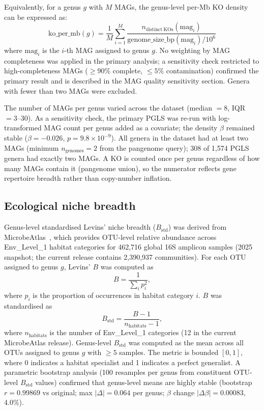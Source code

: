 \documentclass[times]{zHenriquesLab-StyleBioRxiv}
\begin{document}
Equivalently, for a genus $g$ with $M$ MAGs, the genus-level per-Mb KO density
can be expressed as:
\[
\mathrm{ko\_per\_mb}(g)
  = \frac{1}{M}\sum_{i=1}^{M}
    \frac{n_{\mathrm{distinct\ KOs}}(\mathrm{mag}_i)}
         {\mathrm{genome\_size\_bp}(\mathrm{mag}_i) / 10^6}
\]
where $\mathrm{mag}_i$ is the $i$-th MAG assigned to genus $g$. No weighting by
MAG completeness was applied in the primary analysis; a sensitivity check
restricted to high-completeness MAGs ($\geq 90\%$ complete, $\leq 5\%$
contamination) confirmed the primary result and is described in the MAG quality
sensitivity section. Genera with fewer than two MAGs were excluded.

The number of MAGs per genus varied across the dataset (median $= 8$,
IQR $= 3$--30). As a sensitivity check, the primary PGLS was re-run with
log-transformed MAG count per genus added as a covariate; the density $\beta$
remained stable ($\beta = -0.026$, $p = 9.8 \times 10^{-9}$). All genera in
the dataset had at least two MAGs (minimum $n_\text{genomes} = 2$ from the
pangenome query); 308 of 1,574 PGLS genera had exactly two MAGs. A KO is
counted once per genus regardless of how many MAGs contain it (pangenome union),
so the numerator reflects gene repertoire breadth rather than copy-number
inflation.

\subsection{Ecological niche breadth}

Genus-level standardised Levins' niche breadth ($B_\mathrm{std}$) was derived
from MicrobeAtlas~\cite{rodrigues2026}, which provides OTU-level relative
abundance across Env\_Level\_1 habitat categories for 462,716 global 16S
amplicon samples (2025 snapshot; the current release contains 2,390,937
communities). For each OTU assigned to genus $g$, Levins' $B$ was
computed as
\[
B = \frac{1}{\sum_i p_i^2},
\]
where $p_i$ is the proportion of occurrences in habitat category $i$.
$B$ was standardised as
\[
B_\mathrm{std} = \frac{B - 1}{n_\mathrm{habitats} - 1},
\]
where $n_\mathrm{habitats}$ is the number of Env\_Level\_1 categories (12 in
the current MicrobeAtlas release). Genus-level $B_\mathrm{std}$ was computed
as the mean across all OTUs assigned to genus $g$ with $\geq 5$ samples. The
metric is bounded $[0, 1]$, where 0 indicates a habitat specialist and 1
indicates a perfect generalist. A parametric bootstrap analysis (100 resamples
per genus from constituent OTU-level $B_\mathrm{std}$ values) confirmed that
genus-level means are highly stable (bootstrap $r = 0.99869$ vs original;
max $|\Delta| = 0.064$ per genus; $\beta$ change $|\Delta\beta| = 0.00083$,
4.0\%).
\end{document}
